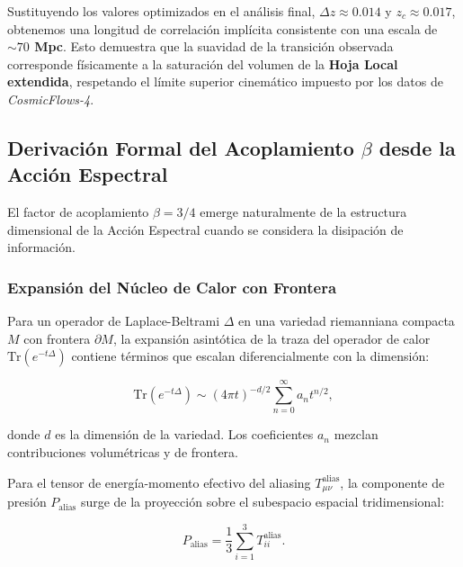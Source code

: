 \documentclass[12pt, a4paper]{article}
\theoremstyle{plain}
\theoremstyle{definition}
\begin{document}
Sustituyendo los valores optimizados en el análisis final, \textbf{$\Delta z \approx 0.014$} y \textbf{$z_c \approx 0.017$}, obtenemos una longitud de correlación implícita consistente con una escala de \textbf{$\sim 70$ Mpc}. Esto demuestra que la suavidad de la transición observada corresponde físicamente a la saturación del volumen de la \textbf{Hoja Local extendida}, respetando el límite superior cinemático impuesto por los datos de \textit{CosmicFlows-4}.


\subsection{Derivación Formal del Acoplamiento \texorpdfstring{$\beta$}{beta} desde la Acción Espectral}
\label{app:beta_spectral}

El factor de acoplamiento $\beta = 3/4$ emerge naturalmente de la estructura 
dimensional de la Acción Espectral cuando se considera la disipación de información.

\subsubsection{Expansión del Núcleo de Calor con Frontera}

Para un operador de Laplace-Beltrami $\Delta$ en una variedad riemanniana 
compacta $M$ con frontera $\partial M$, la expansión asintótica de la traza 
del operador de calor $\text{Tr}(e^{-t\Delta})$ contiene términos que escalan 
diferencialmente con la dimensión:

\begin{equation}
\text{Tr}(e^{-t\Delta}) \sim (4\pi t)^{-d/2} \sum_{n=0}^\infty a_n t^{n/2},
\end{equation}

donde $d$ es la dimensión de la variedad. Los coeficientes $a_n$ mezclan 
contribuciones volumétricas y de frontera.

Para el tensor de energía-momento efectivo del aliasing $T_{\mu\nu}^{\text{alias}}$, 
la componente de presión $P_{\text{alias}}$ surge de la proyección sobre el 
subespacio espacial tridimensional:

\begin{equation}
P_{\text{alias}} = \frac{1}{3} \sum_{i=1}^3 T_{ii}^{\text{alias}}.
\end{equation}
\end{document}
